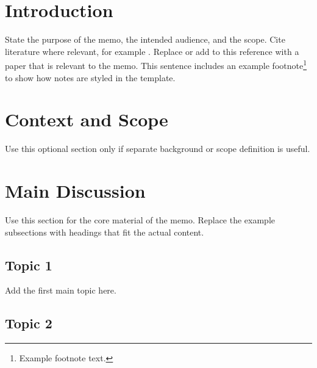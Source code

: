 \documentclass{uksrc-memo}
\begin{document}
\uksrcstandardfrontmatter
%
\uksrclistofabbreviations

\section{Introduction}

State the purpose of the memo, the intended audience, and the scope. Cite literature where relevant, for example \citet{1933Natur.132...66J}. Replace or add to this reference with a paper that is relevant to the memo. This sentence includes an example footnote\footnote{Example footnote text.} to show how notes are styled in the template.

\section{Context and Scope}

Use this optional section only if separate background or scope definition is useful.

\section{Main Discussion}

Use this section for the core material of the memo. Replace the example subsections with headings that fit the actual content.

\subsection{Topic 1}

Add the first main topic here.

\subsection{Topic 2}
\end{document}
